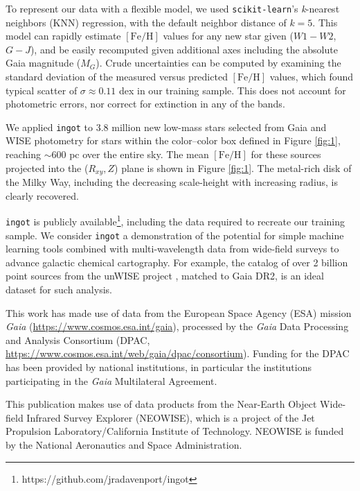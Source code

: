 \documentclass[modern]{rnaastex}
\newcommand{\ingot}{{\tt ingot}\xspace} %
\newcommand{\feh}{$[\mathrm{Fe}/\mathrm{H}]$\xspace}
\begin{document}
To represent our data with a flexible model, we used {\tt scikit-learn}'s {\it k}-nearest neighbors (KNN) regression, with the default neighbor distance of $k=5$. This model can rapidly estimate \feh values for any new star given ($W1-W2$, $G-J$), and be easily recomputed given additional axes including the absolute Gaia magnitude ($M_G$). Crude uncertainties can be computed by examining the standard deviation of the measured versus predicted \feh values, which found typical scatter of $\sigma\approx0.11$ dex in our training sample. This does not account for photometric errors, nor correct for extinction in any of the bands.


We applied \ingot to 3.8 million new low-mass stars selected from Gaia and WISE photometry for stars within the color--color box defined in Figure \ref{fig:1}, reaching $\sim$600 pc over the entire sky. The mean \feh for these sources projected into the ($R_{xy}, Z$) plane is shown in Figure \ref{fig:1}. The metal-rich disk of the Milky Way, including the decreasing scale-height with increasing radius, is clearly recovered.


\ingot is publicly available\footnote{https://github.com/jradavenport/ingot}, including the data required to recreate our training sample. We consider \ingot a demonstration of the  potential for simple machine learning tools combined with multi-wavelength data from wide-field surveys to advance galactic chemical cartography. For example, the catalog of over 2 billion point sources from the unWISE project \citep{schlafly2019}, matched to Gaia DR2, is an ideal dataset for such analysis.




\acknowledgments

This work has made use of data from the European Space Agency (ESA) mission
{\it Gaia} (\url{https://www.cosmos.esa.int/gaia}), processed by the {\it Gaia}
Data Processing and Analysis Consortium (DPAC,
\url{https://www.cosmos.esa.int/web/gaia/dpac/consortium}). Funding for the DPAC
has been provided by national institutions, in particular the institutions
participating in the {\it Gaia} Multilateral Agreement.

This publication makes use of data products from the Near-Earth Object Wide-field Infrared Survey Explorer (NEOWISE), which is a project of the Jet Propulsion Laboratory/California Institute of Technology. NEOWISE is funded by the National Aeronautics and Space Administration.




\end{document}
